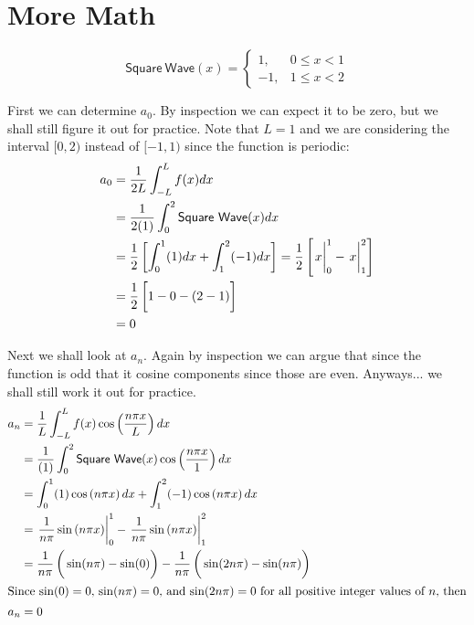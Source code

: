 \documentclass[11pt,letterpaper,twoside]{book}
\begin{document}
\lipsum[13-14]

\section{More Math}

\lipsum[15]

\[
\mathsf{Square\ Wave}(x) = \left\{ 
      \begin{array}{ll} 1, & 0 \leq x < 1 \\ 
                       -1, & 1 \leq x < 2 \end{array} \right.
\]

First we can determine $a_0$.  By inspection we can expect it to be zero, but we shall still 
figure it out for practice.  Note that $L = 1$ and we are considering the interval $[0, 2)$ instead
of $[-1, 1)$ since the function is periodic:
\begin{align*}
a_0 &= \frac{1}{2L} \int_{-L}^L f(x) dx  \\
    &= \frac{1}{2(1)} \int_{0}^{2} \mathsf{Square\ Wave}(x) dx \\
    &= \frac{1}{2} \left[ \int_0^1 (1) dx + \int_1^2 (-1) dx \right] = \frac{1}{2} \left[ \left. \vphantom{\frac{1}{2}} x\right|^1_0 - \left. \vphantom{\frac{1}{2}} x\right|^2_1 \right] \\
    &= \frac{1}{2} \left[ \vphantom{\frac{1}{2}} 1 - 0 - (2 - 1) \right] \\
    &= 0
\end{align*}

Next we shall look at $a_n$.  Again by inspection we can argue that since the function is odd that it
cosine components since those are even.  Anyways... we shall still work it out for practice.
\begin{align*}
a_n &= \frac{1}{L}  \int_{-L}^L f(x) \cos \left( \frac{n\pi x}{L} \right) dx \\
    &= \frac{1}{(1)} \int_{0}^{2} \mathsf{Square\ Wave}(x)\cos \left( \frac{n\pi x}{1} \right) dx \\ 
    &= \int_0^1 (1) \cos \left( n\pi x \right) dx + \int_1^2 (-1) \cos \left( n\pi x \right) dx \\
    &= \left. \frac{1}{n \pi} \sin \left( n\pi x \right)\right|^1_0 -  \left. \frac{1}{n \pi} \sin \left( n\pi x \right)\right|^2_1 \\
    &= \frac{1}{n \pi} \left( \vphantom{\frac{1}{2}} \sin ( n\pi) - \sin(0) \right) - \frac{1}{n \pi} \left( \vphantom{\frac{1}{2}} \sin (2n\pi) - \sin(n\pi) \right) \\
\intertext{Since $\sin(0) = 0$, $\sin ( n\pi) = 0$, and $\sin (2n\pi) = 0$ for all positive integer values of $n$, then}
a_n &= 0
\end{align*}
\end{document}
